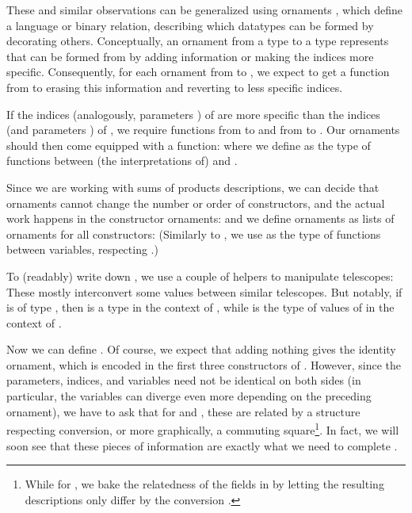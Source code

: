 These and similar observations can be generalized using ornaments \cite{algorn, progorn, sijsling}, which define a language or binary relation, describing which datatypes can be formed by decorating others. Conceptually, an ornament from a type  to a type  represents that  can be formed from  by adding information or making the indices more specific. Consequently, for each ornament from  to , we expect to get a function from  to  erasing this information and reverting to less specific indices.

If the indices  (analogously, parameters ) of  are more specific than the indices  (and parameters ) of , we require functions from  to  and from  to . Our ornaments
should then come equipped with a function:
where we define  as the type of functions between (the interpretations of)  and .

Since we are working with sums of products descriptions, we can decide that ornaments cannot change the number or order of constructors, and the actual work happens in the constructor ornaments:
and we define ornaments as lists of ornaments for all constructors:
(Similarly to , we use  as the type of functions between variables, respecting .)

To (readably) write down , we use a couple of helpers to manipulate telescopes:
These mostly interconvert some values between similar telescopes. But notably, if  is of type , then  is a type in the context of , while  is the type of values of  in the context of .

Now we can define . Of course, we expect that adding nothing gives the identity ornament, which is encoded in the first three constructors of .
However, since the parameters, indices, and variables need not be identical on both sides (in particular, the variables can diverge even more depending on the preceding ornament), we have to ask that for  and , these are related by a structure respecting conversion, or more graphically, a commuting square\footnote{While for , we bake the relatedness of the fields in by letting the resulting descriptions only differ by the conversion .}. In fact, we will soon see that these pieces of information are exactly what we need to complete .

